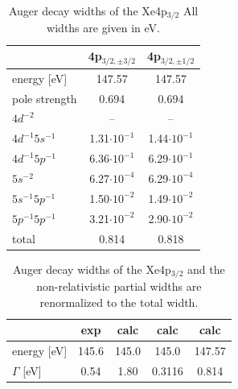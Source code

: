 \begin{table}[h]
 \centering
 \caption{Auger decay widths of the Xe4p$_{3/2}$
          All widths are given in \unit{eV}.}
 \begin{tabular}{lcc}
   \toprule
                      & 4p$_{3/2,\pm 3/2}$ & 4p$_{3/2,\pm 1/2}$  \\
   \midrule                                                      
   energy [\unit{eV}] &   147.57           &    147.57          \\
   pole strength       &     0.694          &      0.694         \\
   \midrule                                                     
   $4d^{-2}$          &      --            &        --            \\
   $4d^{-1}5s^{-1}$   & 1.31$\cdot10^{-1}$ & 1.44$\cdot10^{-1}$ \\
   $4d^{-1}5p^{-1}$   & 6.36$\cdot10^{-1}$ & 6.29$\cdot10^{-1}$ \\
   $5s^{-2}$          & 6.27$\cdot10^{-4}$ & 6.29$\cdot10^{-4}$ \\
   $5s^{-1}5p^{-1}$   & 1.50$\cdot10^{-2}$ & 1.49$\cdot10^{-2}$ \\
   $5p^{-1}5p^{-1}$   & 3.21$\cdot10^{-2}$ & 2.90$\cdot10^{-2}$ \\
   \midrule
   total              &   0.814            &   0.818            \\
   \bottomrule
 \end{tabular}
 \label{table:xe_auger_rest}
\end{table}


\begin{table}[h]
 \centering
 \caption{Auger decay widths of the Xe4p$_{3/2}$ and the non-relativistic
          partial widths are renormalized to the total width.}
 \begin{tabular}{lcccc}
   \toprule
                        & exp   & calc\footnotemark[1] & calc\footnotemark[2] & calc\footnotemark[3] \\
   \midrule                                                                         
   energy [\unit{eV}]   & 145.6 &  145.0       &  145.0       &   147.57   \\
   $\Gamma$ [\unit{eV}] &  0.54 &  1.80        &  0.3116      &  0.814\\
   \bottomrule
 \end{tabular}
 \label{table:xe_auger_comp}
\end{table}

